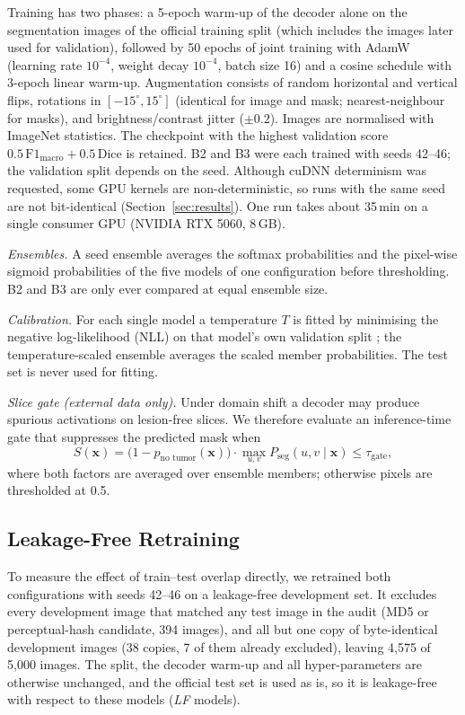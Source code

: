 \documentclass[journal]{IEEEtran}
\begin{document}
Training has two phases: a 5-epoch warm-up of the decoder alone on the segmentation images of the official training split (which includes the images later used for validation), followed by 50 epochs of joint training with AdamW (learning rate $10^{-4}$, weight decay $10^{-4}$, batch size 16) and a cosine schedule with 3-epoch linear warm-up. Augmentation consists of random horizontal and vertical flips, rotations in $[-15^\circ,15^\circ]$ (identical for image and mask; nearest-neighbour for masks), and brightness/contrast jitter ($\pm0.2$). Images are normalised with ImageNet statistics. The checkpoint with the highest validation score $0.5\,\mathrm{F1}_{\text{macro}}+0.5\,\mathrm{Dice}$ is retained. B2 and B3 were each trained with seeds 42--46; the validation split depends on the seed. Although cuDNN determinism was requested, some GPU kernels are non-deterministic, so runs with the same seed are not bit-identical (Section~\ref{sec:results}). One run takes about 35\,min on a single consumer GPU (NVIDIA RTX 5060, 8\,GB).

\textit{Ensembles.} A seed ensemble averages the softmax probabilities and the pixel-wise sigmoid probabilities of the five models of one configuration before thresholding. B2 and B3 are only ever compared at equal ensemble size.

\textit{Calibration.} For each single model a temperature $T$ is fitted by minimising the negative log-likelihood (NLL) on that model's own validation split \cite{guo2017calibration}; the temperature-scaled ensemble averages the scaled member probabilities. The test set is never used for fitting.

\textit{Slice gate (external data only).} Under domain shift a decoder may produce spurious activations on lesion-free slices. We therefore evaluate an inference-time gate that suppresses the predicted mask when
\begin{equation}
S(\mathbf{x})=\bigl(1-p_{\text{no tumor}}(\mathbf{x})\bigr)\cdot\max_{u,v}P_{\text{seg}}(u,v\mid\mathbf{x})\le\tau_{\text{gate}},
\end{equation}
where both factors are averaged over ensemble members; otherwise pixels are thresholded at 0.5.

\subsection{Leakage-Free Retraining}
To measure the effect of train--test overlap directly, we retrained both configurations with seeds 42--46 on a leakage-free development set. It excludes every development image that matched any test image in the audit (MD5 or perceptual-hash candidate, 394 images), and all but one copy of byte-identical development images (38 copies, 7 of them already excluded), leaving 4{,}575 of 5{,}000 images. The split, the decoder warm-up and all hyper-parameters are otherwise unchanged, and the official test set is used as is, so it is leakage-free with respect to these models (\textit{LF} models).
\end{document}
